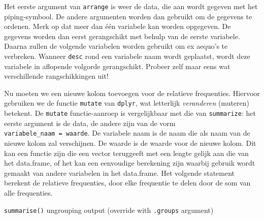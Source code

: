 \documentclass[]{tufte-book}
\newenvironment{Shaded}{}{}
\newcommand{\DataTypeTok}[1]{\textcolor[rgb]{0.56,0.13,0.00}{#1}}
\newcommand{\KeywordTok}[1]{\textcolor[rgb]{0.00,0.44,0.13}{\textbf{#1}}}
\newcommand{\NormalTok}[1]{#1}
\newcommand{\OperatorTok}[1]{\textcolor[rgb]{0.40,0.40,0.40}{#1}}
\newcommand{\StringTok}[1]{\textcolor[rgb]{0.25,0.44,0.63}{#1}}
\begin{document}
Het eerste argument van \texttt{arrange} is weer de data, die aan wordt gegeven met het piping-symbool. De andere argumenten worden dan gebruikt om de gegevens te ordenen. Merk op dat meer dan één variabele kan worden opgegeven. De gegevens worden dan eerst gerangschikt met behulp van de eerste variabele. Daarna zullen de volgende variabelen worden gebruikt om ex aequo's te verbreken. Wanneer \texttt{desc} rond een variabele naam wordt geplaatst, wordt deze variabele in aflopende volgorde gerangschikt. Probeer zelf maar eens wat verschillende rangschikkingen uit!

Nu moeten we een nieuwe kolom toevoegen voor de relatieve frequenties. Hiervoor gebruiken we de functie \texttt{mutate} van \texttt{dplyr}, wat letterlijk \emph{veranderen} (muteren) betekent. De \texttt{mutate} functie-aanroep is vergelijkbaar met die van \texttt{summarize}: het eerste argument is de data, de andere zijn van de vorm \texttt{variabele\_naam\ =\ waarde}. De variabele naam is de naam die als naam van de nieuwe kolom zal verschijnen. De waarde is de waarde voor de nieuwe kolom. Dit kan een functie zijn die een vector teruggeeft met een lengte gelijk aan die van het data.frame, of het kan een eenvoudige berekening zijn waarbij gebruik wordt gemaakt van andere variabelen in het data.frame. Het volgende statement berekent de relatieve frequenties, door elke frequentie te delen door de som van alle frequenties.

\begin{Shaded}
\end{Shaded}

\texttt{summarise()} ungrouping output (override with \texttt{.groups} argument)
\end{document}
